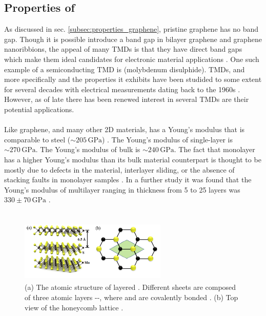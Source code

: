 \documentclass[%
 reprint,
 amsmath,amssymb,
 aps,
pra,
floatfix,
]{revtex4-1}
\begin{document}
\subsection{\label{subsec:mos2_properties} Properties of }
As discussed in sec. \ref{subsec:properties_graphene}, pristine graphene has no band gap. Though it is possible introduce a band gap in bilayer graphene and graphene nanoribbions, the appeal of many TMDs is that they have direct band gaps which make them ideal candidates for electronic material applications \cite{grapheneLike2Dreview2013}. One such example of a semiconducting TMD is  (molybdenum disulphide). TMDs, and more specifically  and the properties it exhibits have been studided to some extent for several decades with electrical measurements dating back to the 1960s \cite{Frindt1963, Fivaz1967}. However, as of late there has been renewed interest in several TMDs are their potential applications. 
\\ \\
Like graphene, and many other 2D materials,  has a Young's modulus that is comparable to steel ($\sim 205 \mathrm{\,GPa}$) \cite{Warlimont2009}. The Young's modulus of single-layer  is $\sim 270 \mathrm{\,GPa}$. The Young's modulus of bulk  is $\sim 240 \mathrm{\,GPa}$. The fact that monolayer  has a higher Young's modulus than its bulk material counterpart is thought to be mostly due to defects in the material, interlayer sliding, or the absence of stacking faults in monolayer samples \cite{Lembke2015}. In a further study it was found that the Young's modulus of multilayer  ranging in thickness from 5 to 25 layers was $330 \pm 70 \mathrm{\,GPa}$ \cite{Castellanos2012}. 
\\ \\


\begin{figure}
\includegraphics[height=3cm, width=7cm]{../figs/mos2diagram}
\caption{(a) The atomic structure of layered . Different sheets are composed of three atomic layers --, where  and  are covalently bonded \cite{Kis2011, grapheneLike2Dreview2013}. (b) Top view of the honeycomb lattice \cite{grapheneLike2Dreview2013}.}
\label{fig:mos2diagram}
\end{figure}
\end{document}

